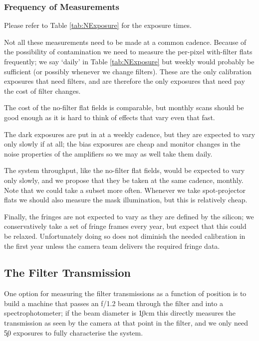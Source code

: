 \subsubsection{Frequency of Measurements}

Please refer to Table \ref{tab:NExposure} for the exposure times.

Not all these measurements need to be made at a common cadence.  Because of the possibility of contamination
we need to measure the per-pixel with-filter flats frequently; we say `daily' in Table \ref{tab:NExposure} but
weekly would probably be sufficient (or possibly whenever we change filters).  These are the only
calibration exposures that need filters, and are therefore the only exposures that need pay the cost
of filter changes.

The cost of the no-filter flat fields is comparable, but monthly scans should be good enough
as it is hard to think of effects that vary even that fast.

The dark exposures are put in at a weekly cadence, but they are expected to vary only slowly if at all;
the bias exposures are cheap and monitor changes in the noise properties of the amplifiers so we may
as well take them daily.

The system throughput, like the no-filter flat fields, would be expected to vary only slowly, and we
propose that they be taken at the same cadence, monthly.  Note that we could take a subset more often.
Whenever we take spot-projector flats we should also measure the mask illumination, but this is relatively
cheap.

Finally, the fringes are not expected to vary as they are defined by the silicon; we conservatively
take a set of fringe frames every year, but expect that this could be relaxed.  Unfortunately doing
so does not diminish the needed calibration in the first year unless the camera team delivers the
required fringe data.

\subsection{The Filter Transmission}
\label{sec:MeasureFilters}

One option for measuring the filter transmissions as a function of position is to build a machine that
passes an f/1.2 beam through the filter and into a spectrophotometer; if the beam diameter is \c 10cm
this directly measures the transmission as seen by the camera at that point in the filter, and we only
need \c 50 exposures to fully characterise the system.


